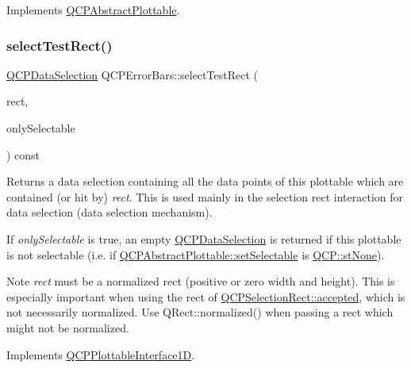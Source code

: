 Implements \mbox{\hyperlink{class_q_c_p_abstract_plottable_addb3f5c41f007a78c3e142cc605bc712}{Q\+C\+P\+Abstract\+Plottable}}.

\mbox{\label{class_q_c_p_error_bars_ad7c727736599dfb173f0952082e1a5b6}} 
\subsubsection{\texorpdfstring{selectTestRect()}{selectTestRect()}}
{\footnotesize\ttfamily \mbox{\hyperlink{class_q_c_p_data_selection}{Q\+C\+P\+Data\+Selection}} Q\+C\+P\+Error\+Bars\+::select\+Test\+Rect (\begin{DoxyParamCaption}\item[{const Q\+RectF \&}]{rect,  }\item[{bool}]{only\+Selectable }\end{DoxyParamCaption}) const\hspace{0.3cm}{\ttfamily [virtual]}}





Returns a data selection containing all the data points of this plottable which are contained (or hit by) {\itshape rect}. This is used mainly in the selection rect interaction for data selection (data selection mechanism).

If {\itshape only\+Selectable} is true, an empty \mbox{\hyperlink{class_q_c_p_data_selection}{Q\+C\+P\+Data\+Selection}} is returned if this plottable is not selectable (i.\+e. if \mbox{\hyperlink{class_q_c_p_abstract_plottable_ac238d6e910f976f1f30d41c2bca44ac3}{Q\+C\+P\+Abstract\+Plottable\+::set\+Selectable}} is \mbox{\hyperlink{namespace_q_c_p_ac6cb9db26a564b27feda362a438db038aa64628e338a2dd1e6f0dc84dec0b63fe}{Q\+C\+P\+::st\+None}}).

\begin{DoxyNote}{Note}
{\itshape rect} must be a normalized rect (positive or zero width and height). This is especially important when using the rect of \mbox{\hyperlink{class_q_c_p_selection_rect_a15a43542e1f7b953a44c260b419e6d2c}{Q\+C\+P\+Selection\+Rect\+::accepted}}, which is not necessarily normalized. Use {\ttfamily Q\+Rect\+::normalized()} when passing a rect which might not be normalized. 
\end{DoxyNote}


Implements \mbox{\hyperlink{class_q_c_p_plottable_interface1_d_a67093e4ccf490ff5f7750640941ff34c}{Q\+C\+P\+Plottable\+Interface1D}}.

